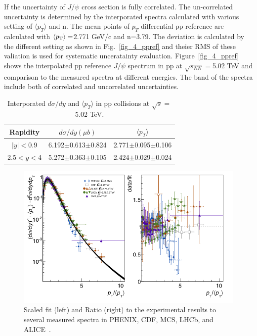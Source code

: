 If the uncertainty of $J/\psi$ cross section is fully correlated. 
The un-correlated uncertainty is determined by the interporated spectra calculated with various setting of $\langle p_{T}\rangle$ and n. 
The mean points of $p_{T}$ differential pp reference are calculated with $\langle p_{\rm{T}}\rangle=$2.771 GeV/c and n=3.79. 
The deviation is calculated by the different setting as shown in Fig.~\ref{fig_4_ppref} and theier RMS of these valiation is used for systematic unceratainty evaluation. 
Figure~\ref{fig_4_ppref} shows the interpolated pp reference $J/\psi$ spectrum in pp at $\sqrt{s_{NN}}=$5.02 TeV and comparison to the measured spectra at different energies. 
The band of the spectra include both of correlated and uncorrelated uncertainties. 
\begin{table}
  \centering
  \begin{tabular}{ccc} \hline
    Rapidity   & $d\sigma/dy (\mu b)$  & $\langle p_{T} \rangle$ \\ \hline
    $|y|<$0.9  & 6.192$\pm$0.613$\pm$0.824  & 2.771$\pm$0.095$\pm$0.106 \\
    2.5$<y<$4  & 5.272$\pm$0.363$\pm$0.105  & 2.424$\pm$0.029$\pm$0.024 \\ \hline
  \end{tabular}
  \caption{Interporated $d\sigma/dy$ and $\langle p_{T}\rangle$ in pp collisions at $\sqrt{s}=$5.02 TeV.}
  \label{table_4_pprefvalue}
\end{table}


\begin{figure}[!h]
  \centering
  \includegraphics[width=15cm]{chap4/figure/ppref/scalefit.png}
  \caption{Scaled fit (left) and Ratio (right) to the experimental results to several measured spectra in PHENIX, CDF, MCS, LHCb, and ALICE~\cite{bib_jpsippref}. 
  }
  \label{fig_4_ppfit}
\end{figure}



